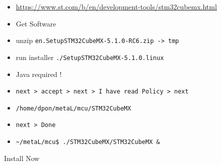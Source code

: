 
\begin{itemize}
  \item 
\url{https://www.st.com/b/en/development-tools/stm32cubemx.html}
  \item
Get Software
\item
unzip \verb|en.SetupSTM32CubeMX-5.1.0-RC6.zip -> tmp|
\item
run installer \verb|./SetupSTM32CubeMX-5.1.0.linux|
\item 
Java required !
\item
\verb|next > accept > next > I have read Policy > next|
\item 
\verb|/home/dpon/metaL/mcu/STM32CubeMX|
\item 
\verb|next > Done|
\item 
\verb|~/metaL/mcu$ ./STM32CubeMX/STM32CubeMX &|
\end{itemize}



 Install Now

\secup